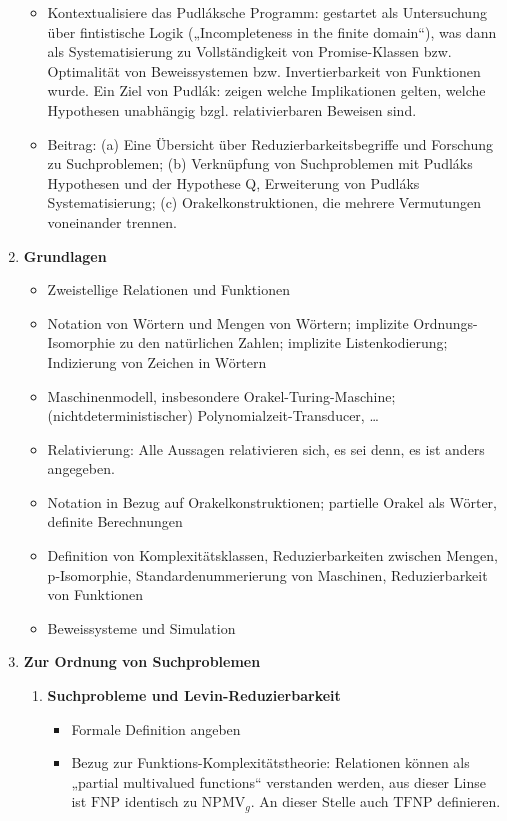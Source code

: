 \documentclass[nofonts]{uebung}
\begin{document}
\begin{enumerate}[label*=\arabic*.]
\begin{itemize}
            \item Kontextualisiere das Pudláksche Programm: gestartet als Untersuchung über fintistische Logik („Incompleteness in the finite domain“), was dann als Systematisierung zu Vollständigkeit von Promise-Klassen bzw. Optimalität von Beweissystemen bzw. Invertierbarkeit von Funktionen wurde. Ein Ziel von Pudlák: zeigen welche Implikationen gelten, welche Hypothesen unabhängig bzgl. relativierbaren Beweisen sind.
            \item Beitrag: (a) Eine Übersicht über Reduzierbarkeitsbegriffe und Forschung zu Suchproblemen; (b) Verknüpfung von Suchproblemen mit Pudláks Hypothesen und der Hypothese Q, Erweiterung von Pudláks Systematisierung; (c) Orakelkonstruktionen, die mehrere Vermutungen voneinander trennen.
        \end{itemize}
    \item \textbf{Grundlagen}
        \begin{itemize}
            \item Zweistellige Relationen und Funktionen
            \item Notation von Wörtern und Mengen von Wörtern; implizite Ordnungs-Isomorphie zu den natürlichen Zahlen; implizite Listenkodierung; Indizierung von Zeichen in Wörtern
            \item Maschinenmodell, insbesondere Orakel-Turing-Maschine; (nichtdeterministischer) Polynomialzeit-Transducer, \ldots
            \item Relativierung: Alle Aussagen relativieren sich, es sei denn, es ist anders angegeben.
            \item Notation in Bezug auf Orakelkonstruktionen; partielle Orakel als Wörter, definite Berechnungen
            \item Definition von Komplexitätsklassen, Reduzierbarkeiten zwischen Mengen, p-Isomorphie, Standardenummerierung von Maschinen, Reduzierbarkeit von Funktionen
            \item Beweissysteme und Simulation
        \end{itemize}
    \item \textbf{Zur Ordnung von Suchproblemen}
        \begin{enumerate}[label*=\arabic*.]
            \item \textbf{Suchprobleme und Levin-Reduzierbarkeit}
                \begin{itemize}
                    \item Formale Definition angeben
                    \item Bezug zur Funktions-Komplexitätstheorie: Relationen können als „partial multivalued functions“ verstanden werden, aus dieser Linse ist $\mathrm{FNP}$ identisch zu $\mathrm{NPMV}_g$. An dieser Stelle auch $\mathrm{TFNP}$ definieren.

\end{itemize}
\end{enumerate}
\end{enumerate}
\end{document}
